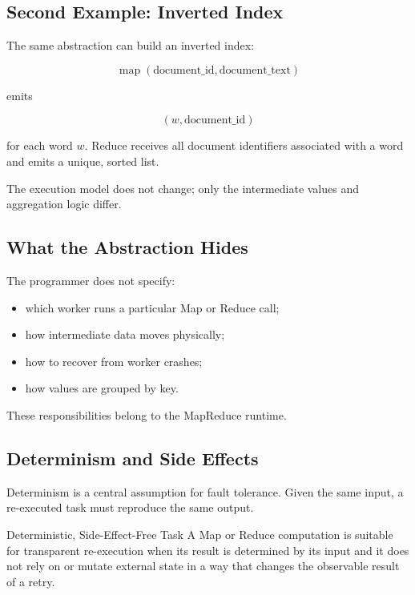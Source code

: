 \documentclass[11pt,a4paper,oneside]{book}
\begin{document}
\subsection{Second Example: Inverted Index}

The same abstraction can build an inverted index:

\[
\operatorname{map}(\text{document\_id},\text{document\_text})
\]

emits

\[
(w,\text{document\_id})
\]

for each word \(w\). Reduce receives all document identifiers associated with a word and emits a unique, sorted list.

The execution model does not change; only the intermediate values and aggregation logic differ.

\subsection{What the Abstraction Hides}

The programmer does not specify:

\begin{itemize}
    \item which worker runs a particular Map or Reduce call;
    \item how intermediate data moves physically;
    \item how to recover from worker crashes;
    \item how values are grouped by key.
\end{itemize}

These responsibilities belong to the MapReduce runtime.

\subsection{Determinism and Side Effects}

Determinism is a central assumption for fault tolerance. Given the same input, a re-executed task must reproduce the same output.

\begin{definitionbox}{Deterministic, Side-Effect-Free Task}
A Map or Reduce computation is suitable for transparent re-execution when its result is determined by its input and it does not rely on or mutate external state in a way that changes the observable result of a retry.
\end{definitionbox}
\end{document}
